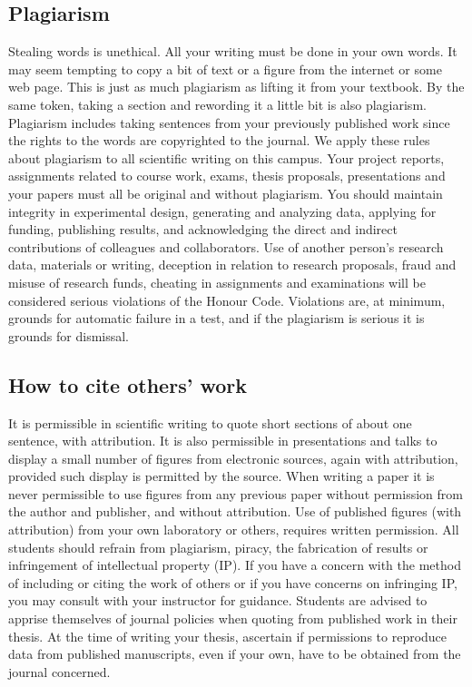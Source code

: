 \documentclass[a4paper]{extarticle}
\begin{document}
\subsection{Plagiarism} Stealing words is unethical. All your writing must be
done in your own words.  It may seem tempting to copy a bit of text or a figure
from the internet or some web page.  This is just as much plagiarism as lifting
it from your textbook. By the same token, taking a section and rewording it a
little bit is also plagiarism. Plagiarism includes taking sentences from your
previously published work since the rights to the words are copyrighted to the
journal. We apply these rules about plagiarism to all scientific writing on this
campus. Your project reports, assignments related to course work, exams, thesis
proposals, presentations and your papers must all be original and without
plagiarism. You should maintain integrity in experimental design, generating and
analyzing data, applying for funding, publishing results, and acknowledging the
direct and indirect contributions of colleagues and
collaborators. Use of another person’s research data, materials or writing, deception in
relation to research proposals, fraud and misuse of research funds, cheating in assignments
and examinations will be considered serious violations of the Honour Code. Violations are,
at minimum, grounds for automatic failure in a test, and if the plagiarism is serious it is
grounds for dismissal.

\subsection{How to cite others' work}
It is permissible in scientific writing to quote short sections of
about one sentence, with attribution. It is also permissible in presentations and talks to
display a small number of figures from electronic sources, again with attribution, provided
such display is permitted by the source. When writing a paper it is never permissible to use
figures from any previous paper without permission from the author and publisher, and
without attribution. Use of published figures (with attribution) from your own laboratory or
others, requires written permission. All students should refrain from plagiarism, piracy, the
fabrication of results or infringement of intellectual property (IP). If you have a concern
with the method of including or citing the work of others or if you have concerns on
infringing IP, you may consult with your instructor for guidance. Students are advised to
apprise themselves of journal policies when quoting from published work in their thesis. At
the time of writing your thesis, ascertain if permissions to reproduce data from published
manuscripts, even if your own, have to be obtained from the journal concerned.
\end{document}
